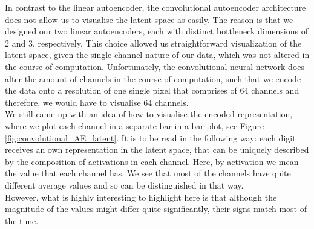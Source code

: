 In contrast to the linear autoencoder, the convolutional autoencoder architecture does not allow us to visualise the latent space as easily. The reason is that we designed our two linear autoencoders, each with distinct bottleneck dimensions of 2 and 3, respectively. This choice allowed us straightforward visualization of the latent space, given the single channel nature of our data, which was not altered in the course of computation. Unfortunately, the convolutional neural network does alter the amount of channels in the course of computation, such that we encode the data onto a resolution of one single pixel that comprises of $64$ channels and therefore, we would have to visualise $64$ channels.\\
We still came up with an idea of how to visualise the encoded representation, where we plot each channel in a separate bar in a bar plot, see Figure \ref{fig:convolutional_AE_latent}. It is to be read in the following way: each digit receives an own representation in the latent space, that can be uniquely described by the composition of activations in each channel. Here, by activation we mean the value that each channel has. We see that most of the channels have quite different average values and so can be distinguished in that way.\\
However, what is highly interesting to highlight here is that although the magnitude of the values might differ quite significantly, their signs match most of the time.



